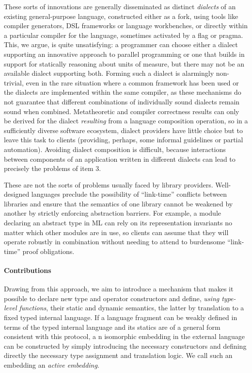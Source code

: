 \documentclass[9pt,preprint]{sigplanconf}
\begin{document}
These sorts of innovations are generally disseminated as distinct \emph{dialects} of an existing general-purpose language, constructed either as a fork, using tools like compiler generators, DSL frame\-works or  language workbenches, or directly within a particular compiler for the language, sometimes activated by a flag or pragma. This, we argue, is quite unsatisfying: a programmer can choose either a dialect supporting an innovative approach to parallel programming or one that builds in support for statically reasoning about units of measure, but there may not be an available dialect supporting both. Forming such a dialect is alarmingly non-trivial, even in the rare situation where a common framework has been used or the dialects are implemented within the same compiler, as these mechanisms do not guarantee that different combinations of individually sound dialects remain sound when combined. Metatheoretic and compiler correctness results can only be derived for the dialect \emph{resulting} from a language   composition operation, so in a sufficiently diverse software ecosystem, dialect providers have little choice but to leave this task to clients (providing, perhaps, some informal guidelines or partial automation). Avoiding dialect composition is difficult, because interactions between components of an application written in different dialects can lead to precisely the problems of item 3.%

These are not the sorts of problems usually faced by library providers. Well-designed languages preclude the  possibility of ``link-time'' conflicts between libraries and ensure that the semantics of one library  cannot be weakened by another by strictly enforcing abstraction barriers. For example, a module declaring an abstract type in ML can rely on its representation invariants no matter which other modules are in use, so clients can assume that they will operate robustly in combination without needing to attend to burdensome ``link-time'' proof obligations. 

\paragraph{Contributions}
Drawing from this approach, we aim to introduce a mechanism that makes it possible to declare new type and operator constructors and define, \emph{using type-level functions}, their static and dynamic semantics, the latter by translation to a fixed typed internal language. If a language fragment can be weakly defined in terms of the typed internal language and its statics are of a general form consistent with this protocol, a n isomorphic embedding in the external language can be constructed by simply introducing the necessary constructors and defining directly the necessary type assignment and translation logic. We call such an embedding an \emph{active embedding}.
\end{document}
